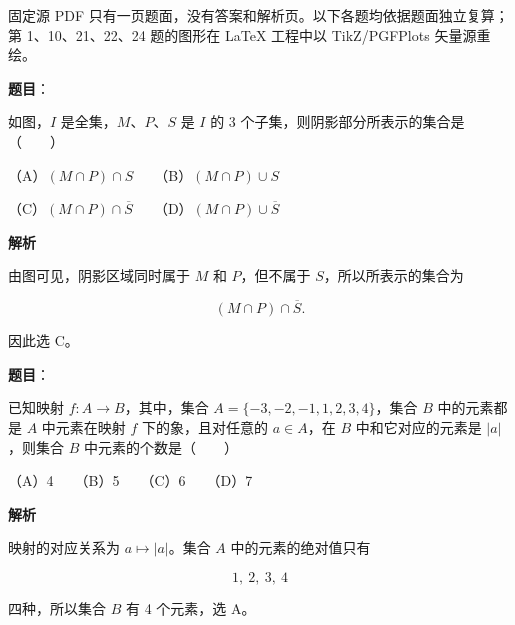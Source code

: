 

\begin{gktip}
固定源 PDF 只有一页题面，没有答案和解析页。以下各题均依据题面独立复算；第 1、10、21、22、24 题的图形在 LaTeX 工程中以 TikZ/PGFPlots 矢量源重绘。
\end{gktip}

\begin{answer}

\textbf{题目}：

如图，$I$ 是全集，$M$、$P$、$S$ 是 $I$ 的 3 个子集，则阴影部分所表示的集合是\mbox{（　　）}
\nopagebreak[4]
\begin{center}\end{center}
\nopagebreak[4]
（A）$(M\cap P)\cap S$　　（B）$(M\cap P)\cup S$

（C）$(M\cap P)\cap\overline S$　　（D）$(M\cap P)\cup\overline S$

\textbf{解析}

由图可见，阴影区域同时属于 $M$ 和 $P$，但不属于 $S$，所以所表示的集合为

\nopagebreak[4]
\[
(M\cap P)\cap\overline S.
\]

因此选 C。


\end{answer}
\begin{answer}

\textbf{题目}：

已知映射 $f:A\to B$，其中，集合 $A=\{-3,-2,-1,1,2,3,4\}$，集合 $B$ 中的元素都是 $A$ 中元素在映射 $f$ 下的象，且对任意的 $a\in A$，在 $B$ 中和它对应的元素是 $|a|$，则集合 $B$ 中元素的个数是\mbox{（　　）}

（A）4　　（B）5　　（C）6　　（D）7

\textbf{解析}

映射的对应关系为 $a\mapsto|a|$。集合 $A$ 中的元素的绝对值只有

\nopagebreak[4]
\[
1,\ 2,\ 3,\ 4
\]

四种，所以集合 $B$ 有 4 个元素，选 A。


\end{answer}
